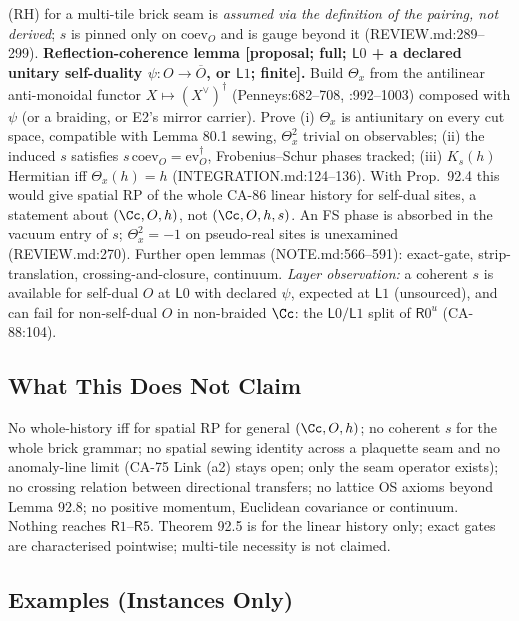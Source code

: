 (RH) for a multi-tile brick seam is \emph{assumed via the definition of the pairing, not derived}; \(s\) is pinned
only on \(\mathrm{coev}_O\) and is gauge beyond it (REVIEW.md:289--299).  \textbf{Reflection-coherence lemma
[proposal; full; \(\mathsf L0\) + a declared unitary self-duality \(\psi:O\to\overline O\), or \(\mathsf L1\); finite].}
Build \(\Theta_x\) from the antilinear anti-monoidal functor \(X\mapsto(X^\vee)^\dagger\) (Penneys:682--708, :992--1003)
composed with \(\psi\) (or a braiding, or E2's mirror carrier).  Prove (i) \(\Theta_x\) is antiunitary on every cut
space, compatible with Lemma 80.1 sewing, \(\Theta_x^2\) trivial on observables; (ii) the induced \(s\) satisfies
\(s\,\mathrm{coev}_O=\mathrm{ev}_O^\dagger\), Frobenius--Schur phases tracked; (iii) \(K_s(h)\) Hermitian iff
\(\Theta_x(h)=h\) (INTEGRATION.md:124--136).  With Prop.~92.4 this would give spatial RP of the whole CA-86 linear
history for self-dual sites, a statement about \((\Cc,O,h)\), not \((\Cc,O,h,s)\).  An FS phase is absorbed in the
vacuum entry of \(s\); \(\Theta_x^2=-1\) on pseudo-real sites is unexamined (REVIEW.md:270).  Further open lemmas
(NOTE.md:566--591): exact-gate, strip-translation, crossing-and-closure, continuum.  \emph{Layer observation:} a
coherent \(s\) is available for self-dual \(O\) at \(\mathsf L0\) with declared \(\psi\), expected at \(\mathsf L1\)
(unsourced), and can fail for non-self-dual \(O\) in non-braided \(\Cc\): the \(\mathsf L0/\mathsf L1\) split of
\(\mathsf R0^u\) (CA-88:104).

\subsection{What This Does Not Claim}

No whole-history iff for spatial RP for general \((\Cc,O,h)\); no coherent \(s\) for the whole brick grammar; no
spatial sewing identity across a plaquette seam and no anomaly-line limit (CA-75 Link (a2) stays open; only the seam
operator exists); no crossing relation between directional transfers; no lattice OS axioms beyond Lemma 92.8; no
positive momentum, Euclidean covariance or continuum.  Nothing reaches \(\mathsf R1\)--\(\mathsf R5\).  Theorem 92.5
is for the linear history only; exact gates are characterised pointwise; multi-tile necessity is not claimed.

\subsection{Examples (Instances Only)}

